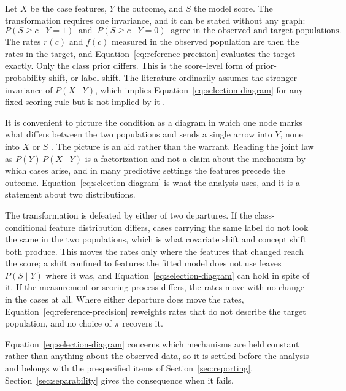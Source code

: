 \documentclass[11pt]{article}
\theoremstyle{remark}
\begin{document}
Let $X$ be the case features, $Y$ the outcome, and $S$ the model score. The transformation requires one invariance, and it can be stated without any graph:
\begin{equation}
P(S\geq c\mid Y=1)
\ \text{ and }\
P(S\geq c\mid Y=0)
\ \text{ agree in the observed and target populations.}
\label{eq:selection-diagram}
\end{equation}
The rates $r(c)$ and $f(c)$ measured in the observed population are then the rates in the target, and Equation~\eqref{eq:reference-precision} evaluates the target exactly. Only the class prior differs. This is the score-level form of prior-probability shift, or label shift. The literature ordinarily assumes the stronger invariance of $P(X\mid Y)$, which implies Equation~\eqref{eq:selection-diagram} for any fixed scoring rule but is not implied by it \cite{saerens2002adjusting,storkey2009training,lipton2018detecting}.

It is convenient to picture the condition as a diagram in which one node marks what differs between the two populations and sends a single arrow into $Y$, none into $X$ or $S$ \cite{pearl2011transportability,bareinboim2013transportability}. The picture is an aid rather than the warrant. Reading the joint law as $P(Y)\,P(X\mid Y)$ is a factorization and not a claim about the mechanism by which cases arise, and in many predictive settings the features precede the outcome. Equation~\eqref{eq:selection-diagram} is what the analysis uses, and it is a statement about two distributions.

The transformation is defeated by either of two departures. If the class-conditional feature distribution differs, cases carrying the same label do not look the same in the two populations, which is what covariate shift and concept shift both produce. This moves the rates only where the features that changed reach the score; a shift confined to features the fitted model does not use leaves $P(S\mid Y)$ where it was, and Equation~\eqref{eq:selection-diagram} can hold in spite of it. If the measurement or scoring process differs, the rates move with no change in the cases at all. Where either departure does move the rates, Equation~\eqref{eq:reference-precision} reweights rates that do not describe the target population, and no choice of $\pi$ recovers it.

Equation~\eqref{eq:selection-diagram} concerns which mechanisms are held constant rather than anything about the observed data, so it is settled before the analysis and belongs with the prespecified items of Section~\ref{sec:reporting}. Section~\ref{sec:separability} gives the consequence when it fails.
\end{document}
